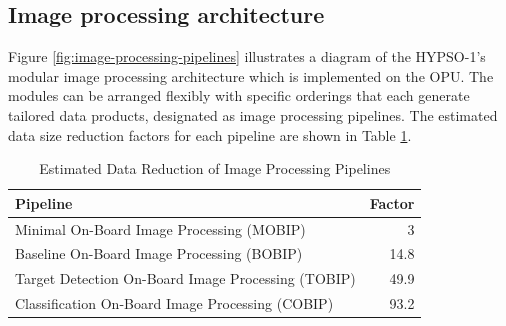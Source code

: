 \subsection{Image processing architecture}
 Figure \ref{fig:image-processing-pipelines} illustrates a diagram of the HYPSO-1's modular image processing architecture which is implemented on the OPU. 
The modules can be arranged flexibly with specific orderings that each generate tailored data products, designated as image processing pipelines.
The estimated data size reduction factors for each pipeline are shown in Table \ref{tab:data-reduction}.
\begin{table}[htbp]
	\caption{Estimated Data Reduction of Image Processing Pipelines}
	\label{tab:data-reduction}
	\centering
	\begin{tabular}{l |r}
	\hline
	Pipeline & Factor \\
	\hline
    Minimal On-Board Image Processing (MOBIP) & 3 \\
    Baseline On-Board Image Processing (BOBIP) & 14.8 \\
    Target Detection On-Board Image Processing (TOBIP) & 49.9 \\
    Classification On-Board Image Processing (COBIP) & 93.2 \\
    \hline
\end{tabular}
\end{table}
